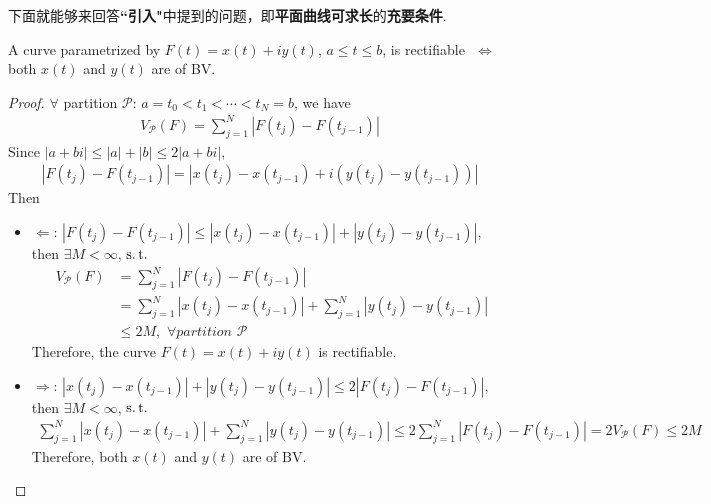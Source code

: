 	\vspace{1em}
	下面就能够来回答\textbf{``引入"}中提到的问题，即\textbf{平面曲线可求长}的\textbf{充要条件}.
	\begin{thm}\label{thm 4.4.1}
		A curve parametrized by $F(t) = x(t) + iy(t)$, $a \leq t \leq b$, is rectifiable $\,\, \Leftrightarrow \,\,$ both $x(t)$ and $y(t)$ are of BV.
		
		\vspace{2em}
		\begin{proof}
			$\forall$ partition $\mathcal{P}$: $a = t_0 < t_1 < \cdots < t_N = b$, we have
			\begin{align}
				V_{\mathcal{P}}(F) = \sum_{j = 1}^{N}{\left| F(t_j) - F(t_{j - 1}) \right|}
			\end{align}
			Since $\left| a + bi \right| \leq \left| a \right| + \left| b \right| \leq 2 \left| a + bi \right|$,
			\begin{align}
				\left| F(t_j) - F(t_{j - 1}) \right| = \left| x(t_j) - x(t_{j - 1}) + i \left( y(t_j) - y(t_{j - 1}) \right) \right|
			\end{align}
			Then
			\begin{itemize}
				\item $\Leftarrow$: $\left| F(t_j) - F(t_{j - 1}) \right| \leq \left| x(t_j) - x(t_{j - 1}) \right| + \left| y(t_j) - y(t_{j - 1}) \right|$, then $\exists M < \infty$, $\operatorname{s.t.}$
				\begin{align}
					V_{\mathcal{P}}(F) 
					&= \sum_{j = 1}^{N}{\left| F(t_j) - F(t_{j - 1}) \right|} \\
					&= \sum_{j = 1}^{N}{\left| x(t_j) - x(t_{j - 1}) \right|} + \sum_{j = 1}^{N}{\left| y(t_j) - y(t_{j - 1}) \right|} \\
					&\leq 2M , \,\, \forall partition \,\, \mathcal{P}
				\end{align}
				Therefore, the curve $F(t) = x(t) + iy(t)$ is rectifiable.
				
				\vspace{1em}
				
				\item $\Rightarrow$: $\left| x(t_j) - x(t_{j - 1}) \right| + \left| y(t_j) - y(t_{j - 1}) \right| \leq 2 \left| F(t_j) - F(t_{j - 1}) \right|$, then $\exists M < \infty$, $\operatorname{s.t.}$
				\begin{align}
					\sum_{j = 1}^{N}{\left| x(t_j) - x(t_{j - 1}) \right|} + \sum_{j = 1}^{N}{\left| y(t_j) - y(t_{j - 1}) \right|} 
					\leq 2 \sum_{j = 1}^{N}{\left| F(t_j) - F(t_{j - 1}) \right|} 
					= 2 V_{\mathcal{P}}(F) 
					\leq 2M
				\end{align}
				Therefore, both $x(t)$ and $y(t)$ are of BV.
			\end{itemize}
		\end{proof}
	\end{thm}

